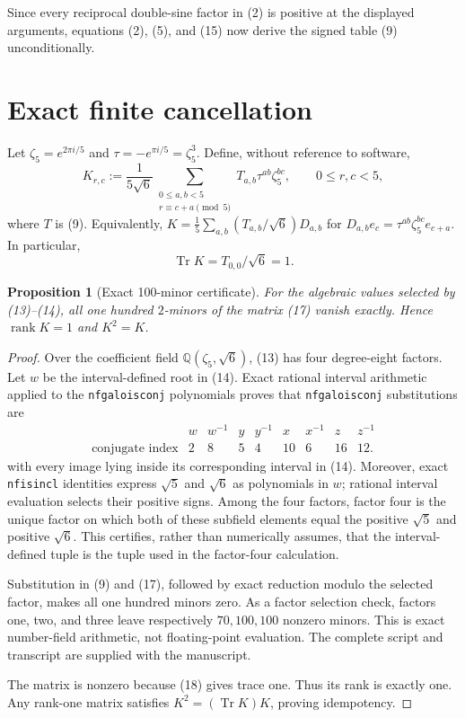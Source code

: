 \documentclass[11pt]{article}
\newtheorem{proposition}[theorem]{Proposition}
\newcommand{\Tr}{\operatorname{Tr}}
\newcommand{\Q}{\mathbb Q}
\begin{document}
Since every reciprocal double-sine factor in (2) is positive at the
displayed arguments, equations (2), (5), and (15) now derive the
signed table (9) unconditionally.

\section{Exact finite cancellation}

Let $\zeta_5=e^{2\pi i/5}$ and
$\tau=-e^{\pi i/5}=\zeta_5^3$.  Define, without reference to software,
\[
 K_{r,c}:=\frac1{5\sqrt6}
 \sum_{\substack{0\le a,b<5\\r\equiv c+a\pmod5}}
 T_{a,b}\tau^{ab}\zeta_5^{bc},
 \qquad 0\le r,c<5,
\tag{17}
\]
where $T$ is (9).  Equivalently,
$K=\frac15\sum_{a,b}(T_{a,b}/\sqrt6)D_{a,b}$ for
$D_{a,b}e_c=\tau^{ab}\zeta_5^{bc}e_{c+a}$.
In particular,
\[
 \Tr K=T_{0,0}/\sqrt6=1.
\tag{18}
\]

\begin{proposition}[Exact 100-minor certificate]\label{prop:minors}
For the algebraic values selected by (13)--(14), all one hundred
$2$-minors of the matrix (17) vanish exactly.  Hence
$\operatorname{rank}K=1$ and $K^2=K$.
\end{proposition}

\begin{proof}
Over the coefficient field $\Q(\zeta_5,\sqrt6)$, (13) has four
degree-eight factors.  Let $w$ be the interval-defined root in (14).
Exact rational interval arithmetic applied to the
\texttt{nfgaloisconj} polynomials proves that
\texttt{nfgaloisconj} substitutions are
\[
\begin{array}{c|cccccccc}
 &w&w^{-1}&y&y^{-1}&x&x^{-1}&z&z^{-1}\\ \hline
\text{conjugate index}&2&8&5&4&10&6&16&12.
\end{array}
\tag{19}
\]
with every image lying inside its corresponding interval in (14).
Moreover, exact \texttt{nfisincl} identities express $\sqrt5$ and
$\sqrt6$ as polynomials in $w$; rational interval evaluation selects
their positive signs.  Among the four factors, factor four is the
unique factor on which both of these subfield elements equal the
positive $\sqrt5$ and positive $\sqrt6$.  This certifies, rather than
numerically assumes, that the interval-defined tuple is the tuple used
in the factor-four calculation.

Substitution in (9) and (17), followed by exact reduction modulo the
selected factor, makes all one hundred minors zero.  As a factor
selection check, factors one, two, and three leave respectively
$70,100,100$ nonzero minors.  This is exact number-field arithmetic,
not floating-point evaluation.  The complete script and transcript
are supplied with the manuscript.

The matrix is nonzero because (18) gives trace one.  Thus its rank is
exactly one.  Any rank-one matrix satisfies
$K^2=(\Tr K)K$, proving idempotency.
\end{proof}
\end{document}
